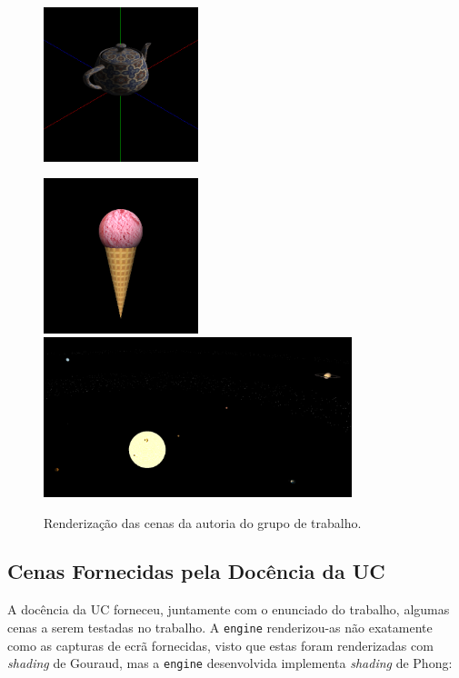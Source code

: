 \documentclass[12pt, a4paper]{article}
\begin{document}
\begin{figure}[H]
    \includegraphics[width=0.4\textwidth]{res/phase4/results/Teapot.png}
\end{figure}

\begin{figure}[H]
    \centering
    \includegraphics[width=0.4\textwidth]{res/phase4/results/IceCream.png} \\
    \includegraphics[width=0.8\textwidth]{res/phase4/results/SolarSystem.png}
    \caption{Renderização das cenas da autoria do grupo de trabalho.}
\end{figure}

\subsection{Cenas Fornecidas pela Docência da UC}

A docência da UC forneceu, juntamente com o enunciado do trabalho, algumas cenas a serem testadas no
trabalho. A \texttt{engine} renderizou-as não exatamente como as capturas de ecrã fornecidas, visto
que estas foram renderizadas com \emph{shading} de Gouraud, mas a \texttt{engine} desenvolvida
implementa \emph{shading} de Phong:
\end{document}
